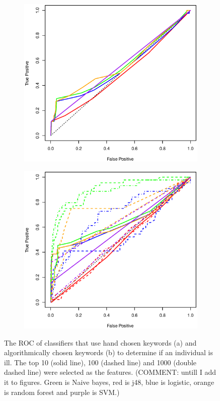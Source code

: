 \documentclass{acm_proc_article-sp}
\begin{document}
\begin{figure} [h]
\centering
\begin{subfigure}[b]{.2\textwidth}
\includegraphics[width=\textwidth]{figs/key_exp_roc.eps}
\end{subfigure}
\begin{subfigure}[b]{.2\textwidth}
\includegraphics[width=\textwidth]{figs/key_dm_roc.eps}
\end{subfigure}
\caption{The ROC of classifiers that use hand chosen keywords (a) and algorithmically chosen keywords (b) to determine if an individual is ill. The top 10 (solid line), 100 (dashed line) and 1000 (double dashed line) were selected as the features. (COMMENT: untill I add it to figures. Green is Naive bayes, red is j48, blue is logistic, orange is random forest and purple is SVM.)}
\label{fig:roc_keyword}
\end{figure}
\end{document}
